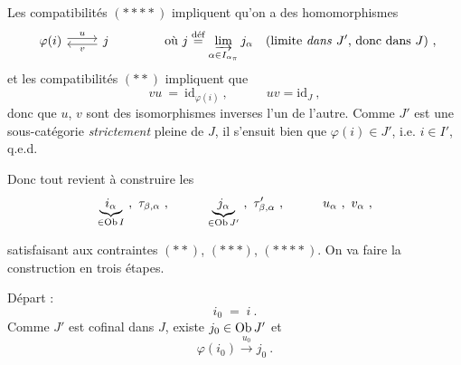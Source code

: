 \noindent Les compatibilités $(****)$ impliquent qu'on a des homomorphismes
\[
\begin{tikzcd}
\varphi(i) \arrow[r, shift left, "u"] & j \arrow[l, shift left, "v"]
\end{tikzcd}
\qquad\qquad \text{où } j \overset{\text{déf}}{=} \varinjlim_{\alpha\in I_{\alpha_\pi}} j_\alpha \quad \text{(limite \textit{dans} $J'$, donc dans $J$)} \ ,
\]
et les compatibilités $(**)$ impliquent que
\[
vu \ = \ \mathrm{id}_{\varphi(i)} \ , \qquad\quad uv = \mathrm{id}_J \ , %
\]
donc que $u$, $v$ sont des isomorphismes inverses l'un de l'autre. Comme $J'$ est une sous-catégorie \textit{strictement} pleine de $J$, il s'ensuit bien que $\varphi(i) \in J'$, i.e. $i \in I'$, q.e.d.

Donc tout revient à construire les
\[
\underbrace{i_\alpha}_{\in \Ob I} \ , \ \tau_{\beta,\alpha} \ , \qquad\quad \underbrace{j_\alpha}_{\in \Ob J'} \ , \ \tau'_{\beta,\alpha} \ , \qquad\quad u_\alpha \ , \ v_\alpha \ ,
\]

satisfaisant aux contraintes $(**)$, $(***)$, $(****)$. On va faire la construction en trois étapes.

 Départ :
\[
i_0 \;=\; i\ .
\]
Comme $J'$ est cofinal dans $J$, existe $j_0\in\operatorname{Ob} J'$ et
\[
\varphi(i_0)\xrightarrow{u_0} j_0\ .
\]


